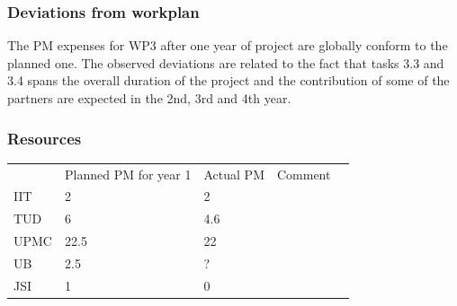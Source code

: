 \documentclass[12pt,a4paper,twoside]{article}
\begin{document}
\subsubsection{Deviations from workplan}  

The PM expenses for WP3 after one year of project are globally conform to the planned one. The observed deviations are related to the fact that tasks 3.3 and 3.4 spans the overall duration of the project and the contribution of some of the partners are expected in the 2nd, 3rd and 4th year.


\subsubsection{Resources}

\begin{center}
\begin{tabular}{|l|l|l|l|l}
\cline{1-4}
 & Planned PM for year 1 & Actual PM & Comment & \\ \cline{1-4}
IIT & 2 & 2 &  &  \\ \cline{1-4}
TUD & 6 & 4.6 &  &  \\ \cline{1-4}
UPMC & 22.5 & 22 &  &  \\ \cline{1-4}
UB & 2.5 & ? &  &  \\ \cline{1-4}
JSI & 1 & 0 &  &  \\ \cline{1-4}
\end{tabular}
\end{center}
\end{document}
